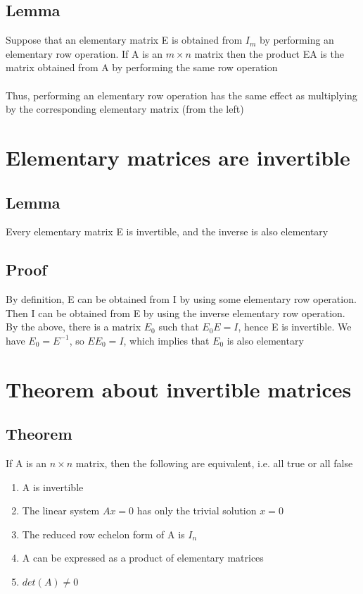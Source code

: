 \documentclass{article}[18pt]
\begin{document}
\subsection{Lemma}
Suppose that an elementary matrix E is obtained from $I_m$ by performing an elementary row operation. If A is an $m\times n$ matrix then the product EA is the matrix obtained from A by performing the same row operation\\
\\
Thus, performing an elementary row operation has the same effect as multiplying by the corresponding elementary matrix (from the left)
\section{Elementary matrices are invertible}
\subsection{Lemma}
Every elementary matrix E is invertible, and the inverse is also elementary
\subsection{Proof}
By definition, E can be obtained from I by using some elementary row operation. Then I can be obtained from E by using the inverse elementary row operation. By the above, there is a matrix $E_0$ such that $E_0E=I$, hence E is invertible. We have $E_0=E^{-1}$, so $EE_0=I$, which implies that $E_0$ is also elementary
\section{Theorem about invertible matrices}
\subsection{Theorem}
If A is an $n\times n$ matrix, then the following are equivalent, i.e. all true or all false
\begin{enumerate}
	\item A is invertible
	\item The linear system $Ax=0$ has only the trivial solution $x=0$
	\item The reduced row echelon form of A is $I_n$
	\item A can be expressed as a product of elementary matrices
	\item $det(A)\neq 0$
\end{enumerate}
\end{document}
